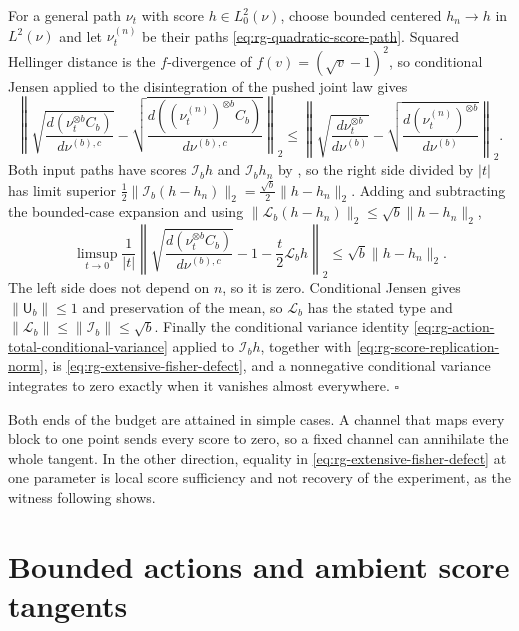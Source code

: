 For a general path \(\nu_t\) with score \(h\in L^2_0(\nu)\), choose bounded centered
\(h_n\to h\) in \(L^2(\nu)\) and let \(\nu_t^{(n)}\) be their paths
\eqref{eq:rg-quadratic-score-path}. Squared Hellinger distance is the \(f\)-divergence of
\(f(v)=(\sqrt v-1)^2\), so conditional Jensen applied to the disintegration of the
pushed joint law gives
\begin{equation}
\left\lVert
\sqrt{\frac{d(\nu_t^{\otimes b}C_b)}{d\nu^{(b),c}}}
-\sqrt{\frac{d((\nu_t^{(n)})^{\otimes b}C_b)}{d\nu^{(b),c}}}
\right\rVert_{2}
\leq
\left\lVert
\sqrt{\frac{d\nu_t^{\otimes b}}{d\nu^{(b)}}}
-\sqrt{\frac{d(\nu_t^{(n)})^{\otimes b}}{d\nu^{(b)}}}
\right\rVert_{2}.
\label{eq:rg-hellinger-contraction}
\end{equation}
Both input paths have scores \(\mathscr I_bh\) and \(\mathscr I_bh_n\) by
, so the right side divided by \(\lvert t\rvert\) has limit
superior \(\tfrac12\lVert\mathscr I_b(h-h_n)\rVert_2=\tfrac{\sqrt b}2\lVert h-h_n\rVert_2\).
Adding and subtracting the bounded-case expansion and using
\(\lVert\mathscr L_b(h-h_n)\rVert_2\leq\sqrt b\lVert h-h_n\rVert_2\),
\begin{equation}
\limsup_{t\to0}\frac1{\lvert t\rvert}
\left\lVert
\sqrt{\frac{d(\nu_t^{\otimes b}C_b)}{d\nu^{(b),c}}}
-1-\frac t2\mathscr L_bh
\right\rVert_2
\leq\sqrt b\lVert h-h_n\rVert_2 .
\label{eq:rg-pushed-score-approximation}
\end{equation}
The left side does not depend on \(n\), so it is zero. Conditional Jensen gives
\(\lVert \mathsf U_b\rVert\leq1\) and preservation of the mean, so \(\mathscr L_b\) has the stated
type and \(\lVert\mathscr L_b\rVert\leq\lVert\mathscr I_b\rVert\leq\sqrt b\). Finally the
conditional variance identity \eqref{eq:rg-action-total-conditional-variance} applied to
\(\mathscr I_bh\), together with \eqref{eq:rg-score-replication-norm}, is
\eqref{eq:rg-extensive-fisher-defect}, and a nonnegative conditional variance integrates
to zero exactly when it vanishes almost everywhere. \hfill$\square$

\medskip
Both ends of the budget are attained in simple cases. A channel that maps every block
to one point sends every score to zero, so a fixed channel can annihilate the whole
tangent. In the other direction, equality in \eqref{eq:rg-extensive-fisher-defect} at
one parameter is local score sufficiency and not recovery of the experiment, as the
witness following  shows.

\section{Bounded actions and ambient score tangents}
\label{sec:ig-score-charts}

